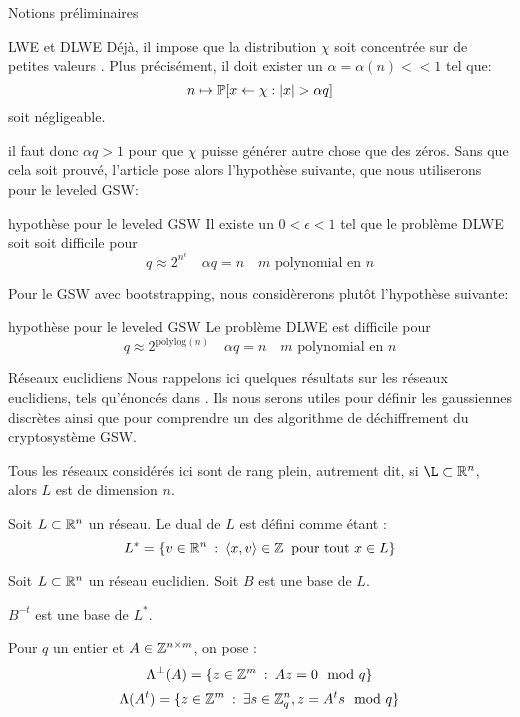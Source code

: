 \begin{section}{Notions préliminaires}
\begin{subsection}{LWE et DLWE}
	Déjà, il impose que la distribution $\chi$ soit \og concentrée sur de
	petites valeurs \fg. Plus précisément, il doit exister un
	$\alpha = \alpha(n) << 1$ tel que:
	\[ n \mapsto \mathbb{P} [x \leftarrow \chi : |x| > \alpha q]\] 
	soit négligeable.

	il faut donc $\alpha q > 1$ pour que $\chi$ puisse générer autre chose 
	que des zéros. 
	Sans que cela soit prouvé, l'article pose alors l'hypothèse suivante,
	que nous utiliserons pour le leveled GSW:

	\begin{hyp}{hypothèse pour le leveled GSW}
	\label{hyp_dlwe}
	Il existe un $0 < \epsilon < 1$ tel que le problème DLWE soit
	soit difficile pour 
	\[ q \approx 2^{n^\epsilon}\quad \alpha q = n\quad \text{$m$ polynomial en $n$}\]
	\end{hyp}

	Pour le GSW avec bootstrapping, nous considèrerons plutôt l'hypothèse
	suivante:
	\begin{hyp}{hypothèse pour le leveled GSW}
	\label{hyp_dlwe_boot}
	Le problème DLWE est difficile pour 
	\[ q \approx 2^\text{polylog$(n)$}\quad \alpha q = n\quad \text{$m$ polynomial en $n$}\]
	\end{hyp}


	\end{subsection}
	\begin{subsection}{Réseaux euclidiens}
	Nous rappelons ici quelques résultats sur les réseaux euclidiens, tels qu'énoncés dans \cite{EC:MicPei12}. Ils nous serons utiles pour définir les gaussiennes discrètes ainsi que pour comprendre un des algorithme de déchiffrement du cryptosystème GSW.

	Tous les réseaux considérés ici sont de rang plein, autrement dit, si $\L \subset \RR^n$, alors $L$ est de dimension $n$.

	\begin{definition}
	Soit $L\subset \mathbb{R}^n$ un réseau. Le dual de $L$ est défini comme étant :
	\[ L^* = \{ v \in \mathbb{R}^n \::\: \langle x, v \rangle \in \mathbb{Z}
	   \:\text{ pour tout } x\in L\} \]
	\end{definition}
	\begin{prop} 
	Soit $L \subset \mathbb{R}^n$ un réseau euclidien. Soit $B$ est une base de $L$.
	
	$B^{-t}$ est une base de $L^*$.
	\end{prop}

	Pour $q$ un entier et $A \in \mathbb{Z}^{n\times m}$, on pose :
		\[\Lambda^\bot(A) = \{ z \in \mathbb{Z}^m\: :\: A z  = 0 \mod q \}\] 
	\[\Lambda(A^t) = \{ z \in \mathbb{Z}^m\: : \: \exists s\in \mathbb{Z}_q^n, z = A^t s \mod q\}\]


\end{subsection}
\end{section}
